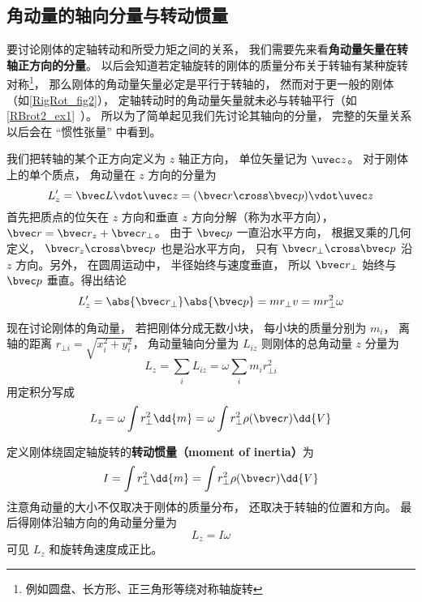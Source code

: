 \subsection{角动量的轴向分量与转动惯量}
要讨论刚体的定轴转动和所受力矩之间的关系， 我们需要先来看\textbf{角动量矢量在转轴正方向的分量}。 以后会知道若定轴旋转的刚体的质量分布关于转轴有某种旋转对称\footnote{例如圆盘、长方形、正三角形等绕对称轴旋转}， 那么刚体的角动量矢量必定是平行于转轴的， 然而对于更一般的刚体（如\autoref{RigRot_fig2}）， 定轴转动时的角动量矢量就未必与转轴平行（如\autoref{RBrot2_ex1}~）。 所以为了简单起见我们先讨论其轴向的分量， 完整的矢量关系以后会在 “惯性张量” 中看到。

我们把转轴的某个正方向定义为 $z$ 轴正方向， 单位矢量记为 $\uvec z$。 对于刚体上的单个质点， 角动量在 $z$ 方向的分量为
\begin{equation}
L'_{z} = \bvec L \vdot \uvec z = (\bvec r \cross \bvec p) \vdot \uvec z
\end{equation}
首先把质点的位矢在 $z$ 方向和垂直 $z$ 方向分解（称为水平方向）， $\bvec r = \bvec r_z + \bvec r_ \bot$。 由于 $\bvec p$ 一直沿水平方向， 根据叉乘的几何定义， $\bvec r_z \cross \bvec p$ 也是沿水平方向， 只有 $\bvec r_ \bot \cross \bvec p$ 沿 $z$ 方向。另外， 在圆周运动中， 半径始终与速度垂直， 所以 $\bvec r_ \bot$ 始终与 $\bvec p$ 垂直。得出结论
\begin{equation}
L'_z = \abs{\bvec r_\bot} \abs{\bvec p} = m r_ \bot v = mr_ \bot ^2\omega 
\end{equation}

现在讨论刚体的角动量， 若把刚体分成无数小块， 每小块的质量分别为 $m_i$， 离轴的距离 $r_{\bot i} = \sqrt{x_i^2 + y_i^2} $， 角动量轴向分量为 $L_{iz}$ 则刚体的总角动量 $z$ 分量为
\begin{equation}
L_z = \sum_i L_{iz} = \omega \sum_i m_i r_{ \bot i}^2
\end{equation}
用定积分写成
\begin{equation}
L_z = \omega \int r_ \bot ^2 \dd{m} = \omega \int r_ \bot ^2\rho(\bvec r)  \dd{V} 
\end{equation}

定义刚体绕固定轴旋转的\textbf{转动惯量（moment of inertia）}为
\begin{equation}
I = \int r_ \bot ^2 \dd{m} = \int r_ \bot ^2\rho(\bvec r) \dd{V} 
\end{equation}
注意角动量的大小不仅取决于刚体的质量分布， 还取决于转轴的位置和方向。 最后得刚体沿轴方向的角动量分量为
\begin{equation}\label{RigRot_eq5}
L_z = I \omega 
\end{equation}
可见 $L_z$ 和旋转角速度成正比。

